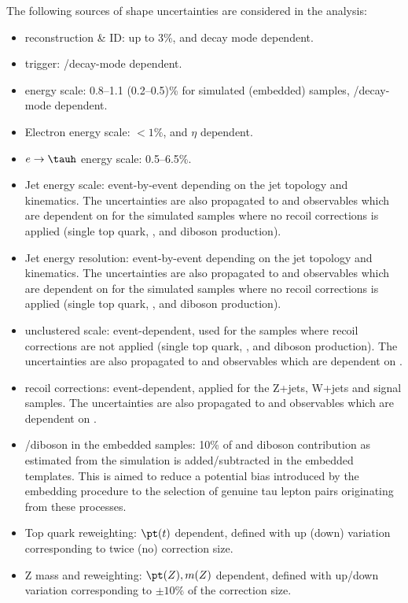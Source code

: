 The following sources of shape uncertainties are considered in the analysis:
\begin{itemize}
    \item \tauh reconstruction \& ID: up to 3\%, \pt and decay mode dependent.
    \item \tauh trigger: \pt/decay-mode dependent.
    \item \tauh energy scale: 0.8–1.1 (0.2–0.5)\% for simulated (embedded) samples, \pt/decay-mode dependent.
    \item Electron energy scale: $<1\%$, \pt and $\eta$ dependent.
    \item $e\to \tauh$ energy scale: 0.5–6.5\%.
    \item Jet energy scale: event-by-event depending on the jet topology and kinematics. The uncertainties are also propagated to \met and observables which are dependent on \met for the simulated samples where no recoil corrections is applied (single top quark, \ttbar, and diboson production). 
    \item Jet energy resolution: event-by-event depending on the jet topology and kinematics. The uncertainties are also propagated to \met and observables which are dependent on \met for the simulated samples where no recoil corrections is applied (single top quark, \ttbar, and diboson production).
    \item \met unclustered scale: event-dependent, used for the samples where recoil corrections are not applied (single top quark, \ttbar, and diboson production). The uncertainties are also propagated to \met and observables which are dependent on \met.
    \item \met recoil corrections: event-dependent, applied for the Z+jets, W+jets and signal samples. The uncertainties are also propagated to \met and observables which are dependent on \met.
    \item \ttbar/diboson in the embedded samples: 10\% of \ttbar and diboson contribution as estimated from the simulation is added/subtracted in the embedded templates. This is aimed to reduce a potential bias introduced by the embedding procedure to the selection of genuine tau lepton pairs originating from these processes.
    \item Top quark \pt reweighting: $\pt(t)$ dependent, defined with up (down) variation corresponding to twice (no) correction size.
    \item Z mass and \pt reweighting: $\pt(Z), m(Z)$ dependent, defined with up/down variation corresponding to $\pm10\%$ of the correction size.

\end{itemize}
